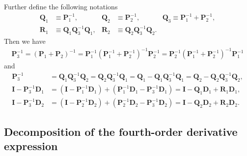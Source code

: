 \documentclass[12pt]{article}
\begin{document}
Further define the following notations
\begin{subequations}  \label{eq:vars_Q=Pinv}
\begin{align}
\mathbf{Q}_1 & \equiv \mathbf{P}_1^{-1}, & \mathbf{Q}_2 & \equiv \mathbf{P}_2^{-1}, & \mathbf{Q}_3 \equiv \mathbf{P}_1^{-1} + \mathbf{P}_2^{-1},  \\
\mathbf{R}_1 & \equiv \mathbf{Q}_1 \mathbf{Q}_3^{-1} \mathbf{Q}_1, & \mathbf{R}_2 & \equiv \mathbf{Q}_2 \mathbf{Q}_3^{-1} \mathbf{Q}_2. &
\end{align}
\end{subequations}
Then we have
\begin{align*}
\mathbf{P}_3^{-1} = (\mathbf{P}_1 + \mathbf{P}_2)^{-1} = \mathbf{P}_1^{-1} (\mathbf{P}_1^{-1} + \mathbf{P}_2^{-1})^{-1} \mathbf{P}_2^{-1} = \mathbf{P}_2^{-1} (\mathbf{P}_1^{-1} + \mathbf{P}_2^{-1})^{-1} \mathbf{P}_1^{-1}
\end{align*}
and
\begin{subequations}  \label{eq:vars_P3related}
\begin{align}
\mathbf{P}_3^{-1} & = \mathbf{Q}_1 \mathbf{Q}_3^{-1} \mathbf{Q}_2 = \mathbf{Q}_2 \mathbf{Q}_3^{-1} \mathbf{Q}_1 = \mathbf{Q}_1 - \mathbf{Q}_1 \mathbf{Q}_3^{-1} \mathbf{Q}_1 = \mathbf{Q}_2 - \mathbf{Q}_2 \mathbf{Q}_3^{-1} \mathbf{Q}_2, \\
\mathbf{I} - \mathbf{P}_3^{-1} \mathbf{D}_1 &= (\mathbf{I} - \mathbf{P}_1^{-1} \mathbf{D}_1) + (\mathbf{P}_1^{-1} \mathbf{D}_1 - \mathbf{P}_3^{-1} \mathbf{D}_1) = \mathbf{I} - \mathbf{Q}_1 \mathbf{D}_1 + \mathbf{R}_1 \mathbf{D}_1,  \\
\mathbf{I} - \mathbf{P}_3^{-1} \mathbf{D}_2 &= (\mathbf{I} - \mathbf{P}_2^{-1} \mathbf{D}_2) + (\mathbf{P}_2^{-1} \mathbf{D}_2 - \mathbf{P}_3^{-1} \mathbf{D}_2) = \mathbf{I} - \mathbf{Q}_2 \mathbf{D}_2 + \mathbf{R}_2 \mathbf{D}_2.
\end{align}
\end{subequations}

\subsection{Decomposition of the fourth-order derivative expression}
\end{document}
